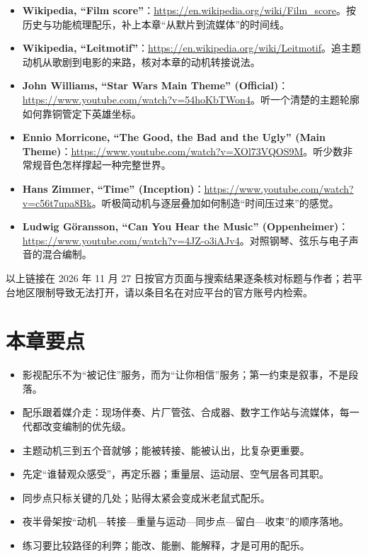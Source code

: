 \begin{sloppypar}
\begin{itemize}
\item \textbf{Wikipedia, “Film score”}：\url{https://en.wikipedia.org/wiki/Film_score}。按历史与功能梳理配乐，补上本章“从默片到流媒体”的时间线。
\item \textbf{Wikipedia, “Leitmotif”}：\url{https://en.wikipedia.org/wiki/Leitmotif}。追主题动机从歌剧到电影的来路，核对本章的动机转接说法。
\item \textbf{John Williams, “Star Wars Main Theme” (Official)}：\url{https://www.youtube.com/watch?v=54hoKbTWon4}。听一个清楚的主题轮廓如何靠铜管定下英雄坐标。
\item \textbf{Ennio Morricone, “The Good, the Bad and the Ugly” (Main Theme)}：\url{https://www.youtube.com/watch?v=XOl73VQOS9M}。听少数非常规音色怎样撑起一种完整世界。
\item \textbf{Hans Zimmer, “Time” (Inception)}：\url{https://www.youtube.com/watch?v=c56t7upa8Bk}。听极简动机与逐层叠加如何制造“时间压过来”的感觉。
\item \textbf{Ludwig Göransson, “Can You Hear the Music” (Oppenheimer)}：\url{https://www.youtube.com/watch?v=4JZ-o3iAJv4}。对照钢琴、弦乐与电子声音的混合编制。
\end{itemize}
\end{sloppypar}

以上链接在 2026 年 11 月 27 日按官方页面与搜索结果逐条核对标题与作者；若平台地区限制导致无法打开，请以条目名在对应平台的官方账号内检索。

\section{本章要点}
\label{sec:film-takeaways}

\begin{itemize}
\item 影视配乐不为“被记住”服务，而为“让你相信”服务；第一约束是叙事，不是段落。
\item 配乐跟着媒介走：现场伴奏、片厂管弦、合成器、数字工作站与流媒体，每一代都改变编制的优先级。
\item 主题动机三到五个音就够；能被转接、能被认出，比复杂更重要。
\item 先定“谁替观众感受”，再定乐器；重量层、运动层、空气层各司其职。
\item 同步点只标关键的几处；贴得太紧会变成米老鼠式配乐。
\item 夜半骨架按“动机—转接—重量与运动—同步点—留白—收束”的顺序落地。
\item 练习要比较路径的利弊；能改、能删、能解释，才是可用的配乐。
\end{itemize}

